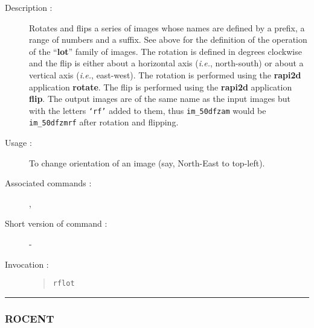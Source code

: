 \begin{description}

\item[Description :] Rotates and flips a series of images whose names
are defined by a prefix, a range of numbers and a suffix. See above for
the definition of the operation of the ``{\bf lot}'' family of images.
The rotation is defined in degrees clockwise and the flip is either
about a horizontal axis (\emph{i.e.}, north-south) or about a vertical
axis (\emph{i.e.}, east-west).  The rotation is performed using the
{\bf rapi2d} application {\bf rotate}.  The flip is performed using the
{\bf rapi2d} application {\bf flip}.  The output images are of the same
name as the input images but with the letters {\tt `rf'} added to them,
thus {\tt im\_50dfzam} would be {\tt im\_50dfzmrf} after rotation and
flipping.

\item[Usage :] To change orientation of an image (say, North-East to top-left).
\item[Associated commands :] {\tt {}}, 
{\tt {}}
\item[Short version of command :] -
\item[Invocation :]

\begin{quote}{\tt  rflot }\end{quote}

\end{description}

\hrule 
\subsubsection*{\label{ROCENT}ROCENT}

